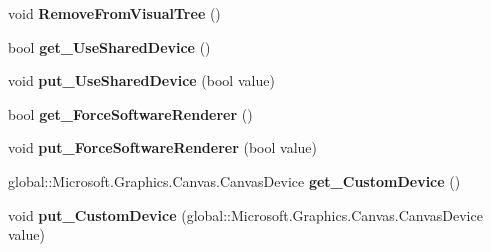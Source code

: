 \begin{DoxyCompactItemize}
void {\bfseries Remove\+From\+Visual\+Tree} ()
\item 
\mbox{\label{class_microsoft_1_1_graphics_1_1_canvas_1_1_u_i_1_1_xaml_1_1_canvas_virtual_control_a3ed6271f1f8ed3b6eb4b6a05dd9e4b55}} 
bool {\bfseries get\+\_\+\+Use\+Shared\+Device} ()
\item 
\mbox{\label{class_microsoft_1_1_graphics_1_1_canvas_1_1_u_i_1_1_xaml_1_1_canvas_virtual_control_ab0da6bda58aa043b46cbaff104c201b3}} 
void {\bfseries put\+\_\+\+Use\+Shared\+Device} (bool value)
\item 
\mbox{\label{class_microsoft_1_1_graphics_1_1_canvas_1_1_u_i_1_1_xaml_1_1_canvas_virtual_control_a64a8765e8e095db44794d48a077da8e9}} 
bool {\bfseries get\+\_\+\+Force\+Software\+Renderer} ()
\item 
\mbox{\label{class_microsoft_1_1_graphics_1_1_canvas_1_1_u_i_1_1_xaml_1_1_canvas_virtual_control_a9f35b2877fdd4f3fe08ce54230303da9}} 
void {\bfseries put\+\_\+\+Force\+Software\+Renderer} (bool value)
\item 
\mbox{\label{class_microsoft_1_1_graphics_1_1_canvas_1_1_u_i_1_1_xaml_1_1_canvas_virtual_control_ac22a92a0de8e5c91b70355745c645d57}} 
global\+::\+Microsoft.\+Graphics.\+Canvas.\+Canvas\+Device {\bfseries get\+\_\+\+Custom\+Device} ()
\item 
\mbox{\label{class_microsoft_1_1_graphics_1_1_canvas_1_1_u_i_1_1_xaml_1_1_canvas_virtual_control_a31200b6eb7450c52a82dd628f921c5e6}} 
void {\bfseries put\+\_\+\+Custom\+Device} (global\+::\+Microsoft.\+Graphics.\+Canvas.\+Canvas\+Device value)
\item 
\mbox{\label{class_microsoft_1_1_graphics_1_1_canvas_1_1_u_i_1_1_xaml_1_1_canvas_virtual_control_a0c92dd8419ce69933e85cefe0b59d3d0}} 

\end{DoxyCompactItemize}
